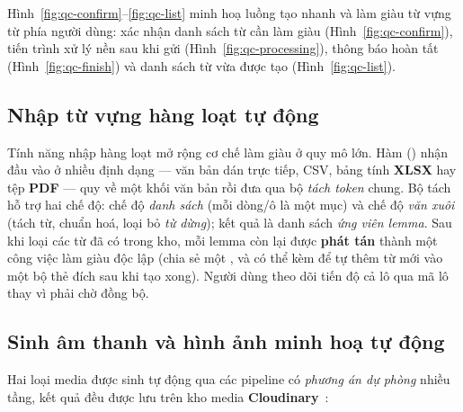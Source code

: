 Hình~\ref{fig:qc-confirm}--\ref{fig:qc-list} minh hoạ luồng tạo nhanh và làm
giàu từ vựng từ phía người dùng: xác nhận danh sách từ cần làm giàu
(Hình~\ref{fig:qc-confirm}), tiến trình xử lý nền sau khi gửi
(Hình~\ref{fig:qc-processing}), thông báo hoàn tất (Hình~\ref{fig:qc-finish})
và danh sách từ vừa được tạo (Hình~\ref{fig:qc-list}).





\subsection{Nhập từ vựng hàng loạt tự động}
\label{subsec:impl-bulk}

Tính năng nhập hàng loạt mở rộng cơ chế làm giàu ở quy mô lớn. Hàm
 () nhận đầu vào ở nhiều định
dạng --- văn bản dán trực tiếp, CSV, bảng tính \textbf{XLSX} hay tệp
\textbf{PDF} --- quy về một khối văn bản rồi đưa qua bộ \textit{tách token}
chung. Bộ tách hỗ trợ hai chế độ: chế độ \textit{danh sách} (mỗi dòng/ô là một
mục) và chế độ \textit{văn xuôi} (tách từ, chuẩn hoá, loại bỏ \textit{từ dừng});
kết quả là danh sách \textit{ứng viên lemma}. Sau khi loại các từ đã có trong
kho, mỗi lemma còn lại được \textbf{phát tán} thành một công việc làm giàu
độc lập (chia sẻ một , và có thể kèm  để
tự thêm từ mới vào một bộ thẻ đích sau khi tạo xong). Người dùng theo dõi
tiến độ cả lô qua mã lô thay vì phải chờ đồng bộ.

\subsection{Sinh âm thanh và hình ảnh minh hoạ tự động}
\label{subsec:impl-media}

Hai loại media được sinh tự động qua các pipeline có \textit{phương án dự
phòng} nhiều tầng, kết quả đều được lưu trên kho media \textbf{Cloudinary}~\cite{cloudinary2024}:

